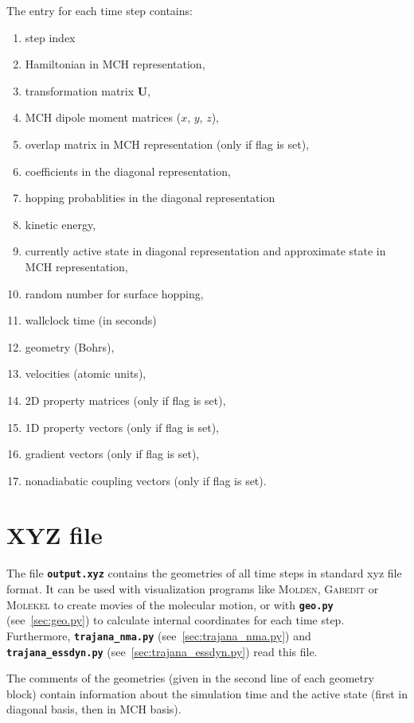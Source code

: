 \documentclass[a4paper,10pt,DIV=15,openany]{scrbook}
\newcommand{\ttt}[1]{\textbf{\texttt{#1}}}
\newcommand{\VEC}[1]{\ensuremath{\mathbf{#1}}}
\begin{document}
The entry for each time step contains:
\begin{enumerate}
  \item step index
  \item Hamiltonian in MCH representation,
  \item transformation matrix $\VEC{U}$,
  \item MCH dipole moment matrices ($x$, $y$, $z$),
  \item overlap matrix in MCH representation (only if flag is set),
  \item coefficients in the diagonal representation,
  \item hopping probablities in the diagonal representation
  \item kinetic energy,
  \item currently active state in diagonal representation and approximate state in MCH representation,
  \item random number for surface hopping,
  \item wallclock time (in seconds)
  \item geometry (Bohrs),
  \item velocities (atomic units),
  \item 2D property matrices (only if flag is set),
  \item 1D property vectors (only if flag is set),
  \item gradient vectors (only if flag is set),
  \item nonadiabatic coupling vectors (only if flag is set).
\end{enumerate}

\section{XYZ file}\label{sec:xyzfile}

The file \ttt{output.xyz} contains the geometries of all time steps in standard xyz file format. It can be used with visualization programs like \textsc{Molden}, \textsc{Gabedit} or \textsc{Molekel} to create movies of the molecular motion, or with \ttt{geo.py} (see~\ref{sec:geo.py}) to calculate internal coordinates for each time step. Furthermore, \ttt{trajana\_nma.py} (see~\ref{sec:trajana_nma.py}) and \ttt{trajana\_essdyn.py} (see~\ref{sec:trajana_essdyn.py}) read this file.

The comments of the geometries (given in the second line of each geometry block) contain information about the simulation time and the active state (first in diagonal basis, then in MCH basis).
\end{document}
